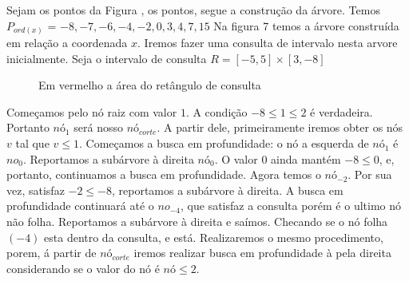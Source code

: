 Sejam os pontos da Figura , os pontos, segue a construção da árvore.
Temos $P_{ord(x)}$ = $-8, -7, -6, -4, -2, 0, 3, 4, 7, 15$
Na figura 7 temos a árvore construída em relação a coordenada $x$.
Iremos fazer uma consulta de intervalo nesta arvore inicialmente.
Seja o intervalo de consulta $R = [-5, 5] \times [3, -8]$

\begin{figure}[H]
\centering
    \caption {Em vermelho a área do retângulo de consulta}
\end{figure}



Começamos pelo nó raiz com valor $1$. A condição $-8 \leq 1 \leq 2$ é verdadeira. Portanto $nó_{1}$
será nosso $nó_{corte}$.
A partir dele, primeiramente iremos obter os nós $v$ tal que $v \leq 1$. Começamos a busca em profundidade:
o nó a esquerda de $nó_{1}$ é $no_{0}$. Reportamos a subárvore à direita $nó_{0}$.
O valor $0$ ainda mantém $-8 \leq 0$, e, portanto, continuamos a busca em profundidade. 
Agora temos o $nó_{-2}$. Por sua vez, satisfaz  $-2 \leq -8$, reportamos a subárvore à direita. A busca
em profundidade continuará até o $no_{-4}$, que satisfaz a consulta porém é o ultimo nó não folha. Reportamos
a subárvore à direita e saímos. Checando se o nó folha $(-4)$ esta dentro da consulta, e está.
Realizaremos o mesmo procedimento, porem, á partir de $nó_{corte}$ iremos realizar busca em profundidade
à pela direita considerando se o valor do nó é $nó \leq 2$.

